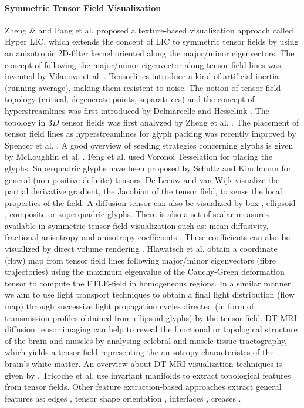 \documentclass{scrartcl}
\begin{document}
\paragraph{Symmetric Tensor Field Visualization}
Zheng \& and Pang \cite{pang&zheng} et al. proposed a texture-based visualization approach called Hyper LIC, which extends the concept of LIC to symmetric tensor fields by using an anisotropic 2D-filter kernel oriented along the major/minor eigenvectors. The concept of following the major/minor eigenvector along tensor field lines was invented by Vilanova et al. \cite{vilanova}. Tensorlines \cite{weinstein} introduce a kind of artificial inertia (running average), making them resistent to noise. The notion of tensor field topology (critical, degenerate points, separatrices) and the concept of hyperstreamlines was first introduced by Delmarcelle and Hesselink \cite{delmarcelle&hesselink}. The topology in $3D$ tensor fields was first analyzed by Zheng et al. \cite{zheng}. The placement of tensor field lines as hyperstreamlines for glyph packing was recently improved by Spencer et al. \cite{spencer}. A good overview of seeding strategies concerning glyphs is given by McLoughlin et al. \cite{mcloughlin}. Feng et al. \cite{feng} used Voronoi Tesselation for placing the glyphs. Superquadric glyphs have been proposed by Schultz and Kindlmann \cite{schultz&kindlmann} for general (non-positive definite) tensors. De Leeuw and van Wijk \cite{deleeuw&vanwijk} visualize the partial derivative gradient, the Jacobian of the tensor field, to sense the local properties of the field. A diffusion tensor can also be visualized by box \cite{makris}, ellipsoid \cite{pierpaoli}, composite \cite{westin2} or superquadric \cite{kindlmann} glyphs. There is also a set of scalar measures available in symmetric tensor field visualization such as: mean diffusivity, fractional anisotropy \cite{basser} and anisotropy coefficients \cite{westin}. These coefficients can also be visualized by direct volume rendering \cite{kindlmann2}. Hlawatsch et al. \cite{hlawatsch} obtain a coordinate (flow) map from tensor field lines following major/minor eigenvectors (fibre trajectories) using the maximum eigenvalue of the Cauchy-Green deformation tensor to compute the FTLE-field in homogeneous regions. In a similar manner, we aim to use light transport techniques to obtain a final light distribution (flow map) through successive light propagation cycles directed (in form of transmission profiles obtained from ellipsoid glyphs) by the tensor field. DT-MRI diffusion tensor imaging can help to reveal the functional \cite{denis} or topological \cite{wakana} structure of the brain and muscles by analysing celebral and muscle tissue tractography, which yields a tensor field representing the anisotropy characteristcs of the brain's white matter. An overview about DT-MRI visualization techniques is given by \cite{vilanova}. Tricoche et al. \cite{xavier} use invariant manifolds to extract topological features from tensor fields. Other feature extraction-based approaches extract general features as: edges \cite{hancock}, tensor shape\/ orientation \cite{gordon}, interfaces \cite{donnel}, creases \cite{tricochet}.
\\
\end{document}

